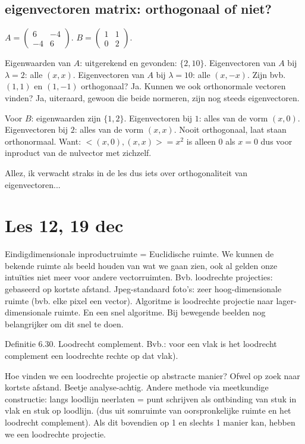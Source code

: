 \documentclass{article}
\begin{document}
\subsection{eigenvectoren matrix: orthogonaal of niet?}

$A = \begin{pmatrix} 6 & -4 \\ -4 & 6 \end{pmatrix}$. $B = \begin{pmatrix} 1 & 1 \\ 0 & 2 \end{pmatrix}$. 

Eigenwaarden van $A$: uitgerekend en gevonden: $\{ 2, 10 \}$. 
Eigenvectoren van $A$ bij $\lambda=2$: alle $(x,x)$. Eigenvectoren van $A$ bij $\lambda=10$: alle $(x,-x)$. 
Zijn bvb. $(1,1)$ en $(1,-1)$ orthogonaal? Ja. Kunnen we ook orthonormale vectoren vinden? Ja, uiteraard, gewoon die beide normeren, zijn nog steeds eigenvectoren. 

Voor $B$: eigenwaarden zijn $\{ 1,2 \}$. Eigenvectoren bij $1$: alles van de vorm $(x,0)$. 
Eigenvectoren bij $2$: alles van de vorm $(x,x)$. Nooit orthogonaal, laat staan orthonormaal. 
Want: $<(x,0), (x,x)> = x^2$ is alleen $0$ als $x=0$ dus voor inproduct van de nulvector met zichzelf. 

Allez, ik verwacht straks in de les dus iets over orthogonaliteit van eigenvectoren... 

\section*{Les 12, 19 dec}

Eindigdimensionale inproductruimte = Euclidische ruimte. 
We kunnen de bekende ruimte als beeld houden van wat we gaan zien, ook al gelden onze intu\"ities niet meer voor andere vectorruimten. Bvb. loodrechte projecties: gebaseerd op kortste afstand. Jpeg-standaard foto's: zeer hoog-dimensionale ruimte (bvb. elke pixel een vector). Algoritme is loodrechte projectie naar lager-dimensionale ruimte. En een snel algoritme. Bij bewegende beelden nog belangrijker om dit snel te doen. 

Definitie 6.30. Loodrecht complement. Bvb.: voor een vlak is het loodrecht complement een loodrechte rechte op dat vlak). 

Hoe vinden we een loodrechte projectie op abstracte manier? Ofwel op zoek naar kortste afstand. Beetje analyse-achtig. Andere methode via meetkundige constructie: langs loodlijn neerlaten = punt schrijven als ontbinding van stuk in vlak en stuk op loodlijn. (dus uit somruimte van oorspronkelijke ruimte en het loodrecht complement). Als dit bovendien op 1 en slechts 1 manier kan, hebben we een loodrechte projectie. 
\end{document}
